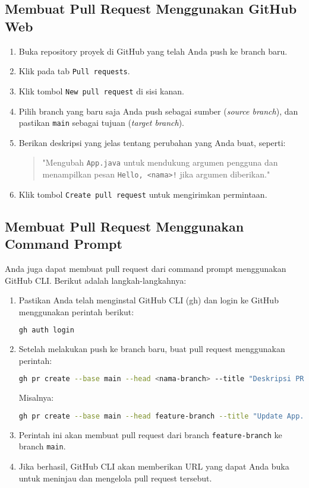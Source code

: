 \subsection{Membuat Pull Request Menggunakan GitHub Web}

\begin{enumerate}
	\item Buka repository proyek di GitHub yang telah Anda push ke branch baru.
	\item Klik pada tab \texttt{Pull requests}.
	\item Klik tombol \texttt{New pull request} di sisi kanan.
	\item Pilih branch yang baru saja Anda push sebagai sumber (\textit{source branch}), dan pastikan \texttt{main} sebagai tujuan (\textit{target branch}).
	\item Berikan deskripsi yang jelas tentang perubahan yang Anda buat, seperti:
	\begin{quote}
		"Mengubah \texttt{App.java} untuk mendukung argumen pengguna dan menampilkan pesan \texttt{Hello, <nama>!} jika argumen diberikan."
	\end{quote}
	\item Klik tombol \texttt{Create pull request} untuk mengirimkan permintaan.
\end{enumerate}

\subsection{Membuat Pull Request Menggunakan Command Prompt}

Anda juga dapat membuat pull request dari command prompt menggunakan GitHub CLI. Berikut adalah langkah-langkahnya:

\begin{enumerate}
	\item Pastikan Anda telah menginstal GitHub CLI (gh) dan login ke GitHub menggunakan perintah berikut:
	\begin{lstlisting}[language=bash]
		gh auth login
	\end{lstlisting}
	
	\item Setelah melakukan push ke branch baru, buat pull request menggunakan perintah:
	\begin{lstlisting}[language=bash]
		gh pr create --base main --head <nama-branch> --title "Deskripsi PR" --body "Deskripsi detail tentang perubahan"
	\end{lstlisting}
	Misalnya:
	\begin{lstlisting}[language=bash]
		gh pr create --base main --head feature-branch --title "Update App.java" --body "Menambahkan dukungan untuk argumen pengguna pada App.java"
	\end{lstlisting}
	
	\item Perintah ini akan membuat pull request dari branch \texttt{feature-branch} ke branch \texttt{main}.
	
	\item Jika berhasil, GitHub CLI akan memberikan URL yang dapat Anda buka untuk meninjau dan mengelola pull request tersebut.
\end{enumerate}

